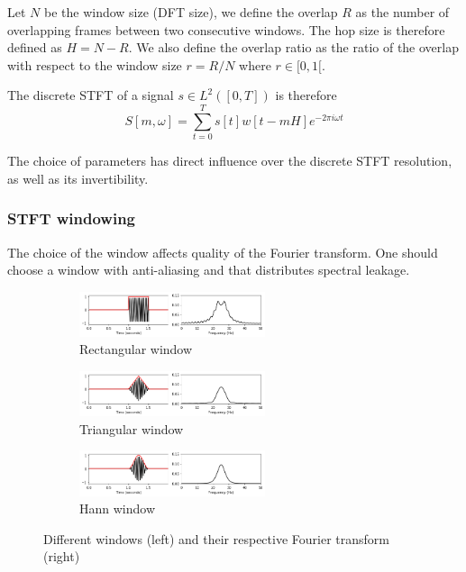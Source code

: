 \documentclass[american,]{article}
\theoremstyle{definition}
\theoremstyle{definition}
\theoremstyle{definition}
\theoremstyle{remark}
\begin{document}
Let \(N\) be the window size (DFT size), we define the overlap \(R\)
as the number of overlapping frames between two consecutive windows.
The hop size is therefore defined as \(H=N-R\).
We also define the overlap ratio as the ratio of the overlap
with respect to the window size \(r=R/N\) where \(r\in[0,1[\).

The discrete STFT of a signal \(s\in L^2([0,T])\) is therefore
\begin{equation}
S[m,\omega] = \sum_{t=0}^{T} s[t]w[t-mH]e^{-2\pi i\omega t}
\end{equation}

The choice of parameters has direct influence over the discrete STFT
resolution, as well as its invertibility.

\hypertarget{stft-windowing}{%
\subsubsection{STFT windowing}\label{stft-windowing}}

The choice of the window affects quality of the Fourier transform.
One should choose a window with anti-aliasing and that distributes
spectral leakage.

\begin{figure}[H]
    \centering
    \begin{subfigure}[t]{\textwidth}
        \centering
        \includegraphics[width=0.6\textwidth]{img/w_rectangle.png}
        \caption{Rectangular window}
    \end{subfigure}
    \begin{subfigure}[t]{\textwidth}
        \centering
        \includegraphics[width=0.6\textwidth]{img/w_triangle.png}
        \caption{Triangular window}
    \end{subfigure}
    \begin{subfigure}[t]{\textwidth}
        \centering
        \includegraphics[width=0.6\textwidth]{img/w_hann.png}
        \caption{Hann window}
    \end{subfigure}
    \caption{Different windows (left) and their respective Fourier transform (right)}
\end{figure}
\end{document}
